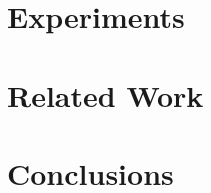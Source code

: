 \documentclass[10pt,conference,letterpaper]{IEEEtran}
\begin{document}
\section{Experiments}
\label{sec:experiments}


\section{Related Work}
\label{sec:related}


%

\section{Conclusions}



%






%
\end{document}
